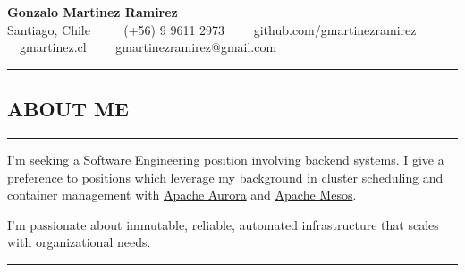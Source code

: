 \documentclass[10pt,letterpaper]{article}
\newcommand\titlePersonalInfo[6]{
  \begin{center}{\huge \textbf{#1}}
  \\  #2 \ \ \textbullet
    \ \ #3\ \ \textbullet
    \ \ #4\ \ \textbullet
    \ \ #5\ \ \textbullet
    \ \ #6    
  \end{center}
}
\begin{document}
    
  \titlePersonalInfo{Gonzalo Martinez Ramirez}{Santiago, Chile}{(+56) 9 9611 2973}{github.com/gmartinezramirez}{gmartinez.cl}{gmartinezramirez@gmail.com}
  
  \hrule
  \vspace{-1.0em}
  \subsection*{ABOUT ME}
  \vspace{-0.3em}
  \hrule
  \vspace{0.5em}
  
  \noindent I'm seeking a Software Engineering position involving backend systems.
  I give a preference to positions which leverage my background in cluster
  scheduling and container management with \href{aurora.apache.org}{Apache Aurora}
  and \href{mesos.apache.org}{Apache Mesos}.
  
  \noindent I'm passionate about immutable, reliable, automated infrastructure
  that scales with organizational needs.
  \\
  
  \hrule
  \vspace{-1.0em}
\end{document}
